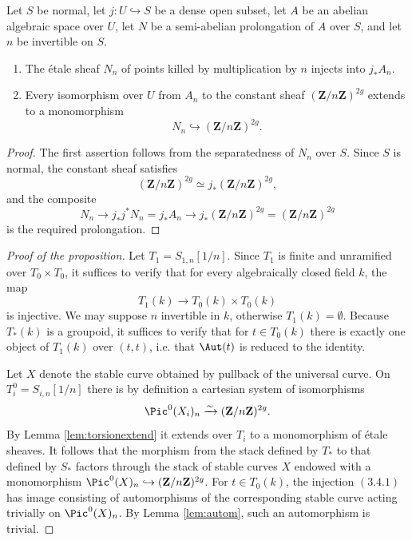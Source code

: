 \begin{lemma}\label{lem:torsionextend}
Let $S$ be normal, let $j:U\hookrightarrow S$ be a dense open subset, let $A$ be an abelian algebraic space over $U$, let $N$ be a semi-abelian prolongation of $A$ over $S$, and let $n$ be invertible on $S$.
\begin{enumerate}[label=(\roman*)]
\item The étale sheaf $N_n$ of points killed by multiplication by $n$ injects into $j_*A_n$.
\item Every isomorphism over $U$ from $A_n$ to the constant sheaf $(\mathbf Z/n\mathbf Z)^{2g}$ extends to a monomorphism
\[
  N_n\hookrightarrow (\mathbf Z/n\mathbf Z)^{2g}.
\]
\end{enumerate}
\end{lemma}

\begin{proof}
The first assertion follows from the separatedness of $N_n$ over $S$. Since $S$ is normal, the constant sheaf satisfies
\[
  (\mathbf Z/n\mathbf Z)^{2g}\simeq j_*(\mathbf Z/n\mathbf Z)^{2g},
\]
and the composite
\[
  N_n\longrightarrow j_*j^*N_n=j_*A_n\longrightarrow j_*(\mathbf Z/n\mathbf Z)^{2g}
        =(\mathbf Z/n\mathbf Z)^{2g}
\]
is the required prolongation.
\end{proof}

\begin{proof}[Proof of the proposition]
Let $T_1=S_{1,n}[1/n]$. Since $T_1$ is finite and unramified over $T_0\times T_0$, it suffices to verify that for every algebraically closed field $k$, the map
\[
  T_1(k)\longrightarrow T_0(k)\times T_0(k)
\]
is injective. We may suppose $n$ invertible in $k$, otherwise $T_1(k)=\emptyset$. Because $T_*(k)$ is a groupoid, it suffices to verify that for $t\in T_0(k)$ there is exactly one object of $T_1(k)$ over $(t,t)$, i.e. that $\Aut(t)$ is reduced to the identity.

Let $X$ denote the stable curve obtained by pullback of the universal curve. On $T_i^0=S_{i,n}[1/n]$ there is by definition a cartesian system of isomorphisms
\[
  \Pic^0(X_i)_n\xrightarrow{\sim}(\mathbf Z/n\mathbf Z)^{2g}.
\]
By Lemma \ref{lem:torsionextend} it extends over $T_i$ to a monomorphism of étale sheaves. It follows that the morphism from the stack defined by $T_*$ to that defined by $S_*$ factors through the stack of stable curves $X$ endowed with a monomorphism $\Pic^0(X)_n\hookrightarrow(\mathbf Z/n\mathbf Z)^{2g}$. For $t\in T_0(k)$, the injection \((3.4.1)\) has image consisting of automorphisms of the corresponding stable curve acting trivially on $\Pic^0(X)_n$. By Lemma \ref{lem:autom}, such an automorphism is trivial.
\end{proof}

